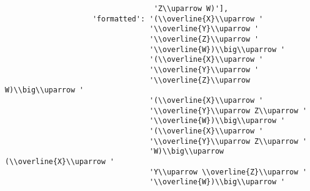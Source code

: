 \begin{verbatim}
                                  'Z\\uparrow W)'],
                    'formatted': '(\\overline{X}\\uparrow '
                                 '\\overline{Y}\\uparrow '
                                 '\\overline{Z}\\uparrow '
                                 '\\overline{W})\\big\\uparrow '
                                 '(\\overline{X}\\uparrow '
                                 '\\overline{Y}\\uparrow '
                                 '\\overline{Z}\\uparrow W)\\big\\uparrow '
                                 '(\\overline{X}\\uparrow '
                                 '\\overline{Y}\\uparrow Z\\uparrow '
                                 '\\overline{W})\\big\\uparrow '
                                 '(\\overline{X}\\uparrow '
                                 '\\overline{Y}\\uparrow Z\\uparrow '
                                 'W)\\big\\uparrow (\\overline{X}\\uparrow '
                                 'Y\\uparrow \\overline{Z}\\uparrow '
                                 '\\overline{W})\\big\\uparrow '

\end{verbatim}
